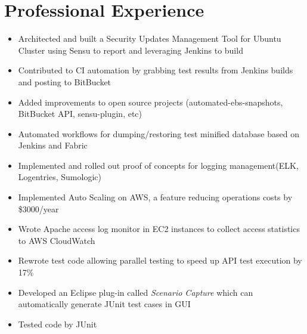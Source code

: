 \documentclass{resume}
\begin{document}
%
%


\section{Professional Experience}
\begin{itemize}
\item Architected and built a Security Updates Management Tool for Ubuntu Cluster using Sensu to report and leveraging Jenkins to build
\item Contributed to CI automation by grabbing test results from Jenkins builds and posting to BitBucket
\item Added improvements to open source projects (automated-ebs-snapshots, BitBucket API, sensu-plugin, etc)
\item Automated workflows for dumping/restoring test minified database based on Jenkins and Fabric
\item Implemented and rolled out proof of concepts for logging management(ELK, Logentries, Sumologic)
\end{itemize}

\begin{itemize}
\item Implemented Auto Scaling on AWS, a feature reducing operations costs by \$3000/year
\item Wrote Apache access log monitor in EC2 instances to collect access statistics to AWS CloudWatch
\item Rewrote test code allowing parallel testing to speed up API test execution by 17\%
\end{itemize}

\begin{itemize}
\item Developed an Eclipse plug-in called \textit{Scenario Capture} which can automatically generate JUnit test cases in GUI
\item Tested code by JUnit
\end{itemize}
\end{document}
